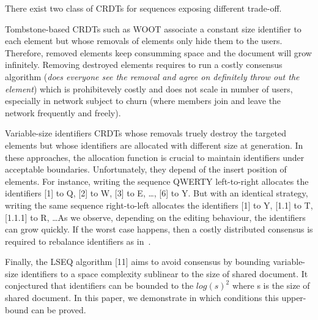 \begin{asparadesc}
  There exist two class of CRDTs for sequences exposing different
  trade-off.
\item [Tombstone-based] CRDTs such as WOOT\cite{oster2006data}
  associate a constant size identifier to each element but whose
  removals of elements only hide them to the users. Therefore, removed
  elements keep consumming space and the document will grow
  infinitely. Removing destroyed elements requires to run a costly
  consensus algorithm (\emph{does everyone see the removal and agree
    on definitely throw out the element}) which is prohibitevely
  costly and does not scale in number of users, especially in network
  subject to churn (where members join and leave the network
  frequently and freely).

\item [Variable-size identifiers] CRDTs whose removals truely destroy
  the targeted elements but whose identifiers are allocated with
  different size at generation. In these approaches, the allocation
  function is crucial to maintain identifiers under acceptable
  boundaries. Unfortunately, they depend of the insert position of
  elements. For instance, writing the sequence QWERTY left-to-right
  allocates the identifiers [1] to Q, [2] to W, [3] to E, \ldots, [6]
  to Y. But with an identical strategy, writing the same sequence
  right-to-left allocates the identifiers [1] to Y, [1.1] to T,
  [1.1.1] to R, \ldots As we observe, depending on the editing
  behaviour, the identifiers can grow quickly.  If the worst case
  happens, then a costly distributed consensus is required to
  rebalance identifiers as in~\cite{zawirski2011asynchronous}.

Finally, the LSEQ algorithm [11] aims to avoid consensus by bounding
variable- size identifiers to a space complexity sublinear to the size
of shared document. It conjectured that identifiers can be bounded to
the $log(s)^2$ where s is the size of shared document. In this paper,
we demonstrate in which conditions  this upper-bound can be proved.

\end{asparadesc}

